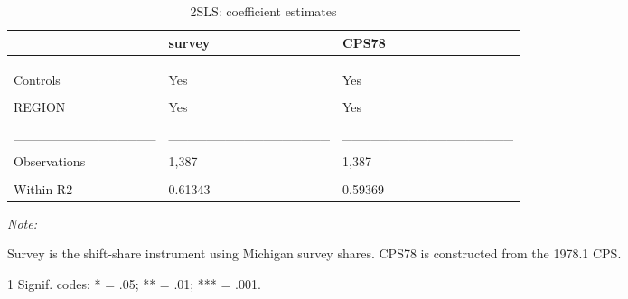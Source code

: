 \begin{table}

\caption{\label{tab:table:2sls:stage2:noloo}2SLS: coefficient estimates}
\centering
\begin{threeparttable}
\begin{tabular}[t]{lll}
\toprule
  & survey & CPS78\\
\midrule
\cellcolor{gray!6}{Dependent Var.:} & \cellcolor{gray!6}{RegInf} & \cellcolor{gray!6}{RegInf}\\
\addlinespace
 &  & \\
\addlinespace
\cellcolor{gray!6}{pe} & \cellcolor{gray!6}{0.1307** (0.0448)} & \cellcolor{gray!6}{0.2307*** (0.0622)}\\
\addlinespace
Controls & Yes & Yes\\
\addlinespace
\cellcolor{gray!6}{Fixed-Effects:} & \cellcolor{gray!6}{-----------------} & \cellcolor{gray!6}{------------------}\\
\addlinespace
REGION & Yes & Yes\\
\addlinespace
\cellcolor{gray!6}{TIME} & \cellcolor{gray!6}{Yes} & \cellcolor{gray!6}{Yes}\\
\addlinespace
\_\_\_\_\_\_\_\_\_\_\_\_\_\_\_ & \_\_\_\_\_\_\_\_\_\_\_\_\_\_\_\_\_ & \_\_\_\_\_\_\_\_\_\_\_\_\_\_\_\_\_\_\\
\addlinespace
\cellcolor{gray!6}{S.E. type} & \cellcolor{gray!6}{Drisc.-Kra. (L=4)} & \cellcolor{gray!6}{Drisco.-Kra. (L=4)}\\
\addlinespace
Observations & 1,387 & 1,387\\
\addlinespace
\cellcolor{gray!6}{R2} & \cellcolor{gray!6}{0.96009} & \cellcolor{gray!6}{0.95806}\\
\addlinespace
Within R2 & 0.61343 & 0.59369\\
\bottomrule
\end{tabular}
\begin{tablenotes}
\item \textit{Note: } 
\item Survey is the shift-share instrument using Michigan survey shares. CPS78 is constructed from the 1978.1 CPS.
\item[1] Signif. codes: * = .05; ** = .01; *** = .001.
\end{tablenotes}
\end{threeparttable}
\end{table}
